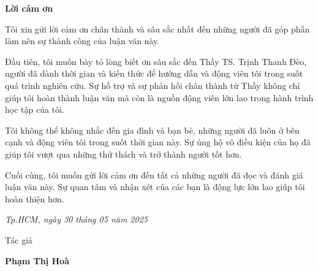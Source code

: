 
\begin{center}
\LARGE{\textbf{Lời cảm ơn}}
\end{center}

Tôi xin gửi lời cảm ơn chân thành và sâu sắc nhất đến những người đã góp phần làm nên sự thành công của luận văn này.

Đầu tiên, tôi muốn bày tỏ lòng biết ơn sâu sắc đến Thầy TS. Trịnh Thanh Đèo, người đã dành thời gian và kiến thức để hướng dẫn và động viên tôi trong suốt quá trình nghiên cứu. Sự hỗ trợ và sự phản hồi chân thành từ Thầy không chỉ giúp tôi hoàn thành luận văn mà còn là nguồn động viên lớn lao trong hành trình học tập của tôi.

Tôi không thể không nhắc đến gia đình và bạn bè, những người đã luôn ở bên cạnh và động viên tôi trong suốt thời gian này. Sự ủng hộ vô điều kiện của họ đã giúp tôi vượt qua những thử thách và trở thành người tốt hơn.

Cuối cùng, tôi muốn gửi lời cảm ơn đến tất cả những người đã đọc và đánh giá luận văn này. Sự quan tâm và nhận xét của các bạn là động lực lớn lao giúp tôi hoàn thiện hơn.
\begin{flushright}
{\it Tp.HCM, ngày 30 tháng 05 năm 2025}

Tác giả\hskip 2cm\quad

\vskip 2cm

{\bf Phạm Thị Hoà} \hskip 1cm \quad\ 
 \end{flushright}
\thispagestyle{empty}
